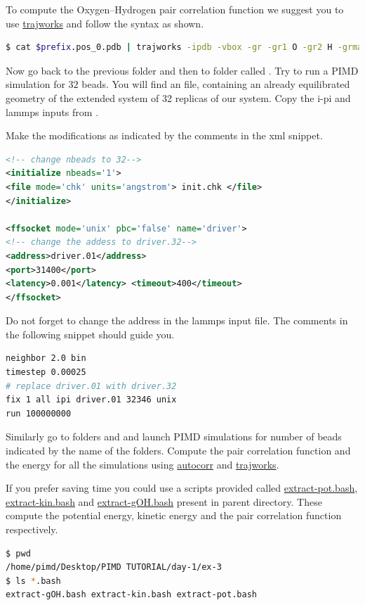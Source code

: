 \documentclass{article}
\begin{document}
\begin{Exercise}[label={basic},title={Benchmark of quantum effects in a water molecule}]
\Question
To compute the Oxygen--Hydrogen pair correlation function we suggest you to use \url{trajworks} and follow the syntax as shown. 
\begin{lstlisting}[language=bash]
$ cat $prefix.pos_0.pdb | trajworks -ipdb -vbox -gr -gr1 O -gr2 H -grmax 2 -hwin triangle -hwinfac 5  > gOO.data 
\end{lstlisting}

\Question
Now go back to the previous folder and then to folder called . Try to run a PIMD simulation for $32$ beads. You will find an  file, containing an already equilibrated geometry of the extended system of 32 replicas of our system. Copy the i-pi and lammps inputs from .

\Question
Make the modifications as indicated by the comments in the xml snippet.
\begin{lstlisting}[language=xml]
<!-- change nbeads to 32--> 
<initialize nbeads='1'>  
<file mode='chk' units='angstrom'> init.chk </file>
</initialize>

<ffsocket mode='unix' pbc='false' name='driver'>
<!-- change the addess to driver.32--> 
<address>driver.01</address>
<port>31400</port>
<latency>0.001</latency> <timeout>400</timeout>
</ffsocket>
\end{lstlisting}

\Question
Do not forget to change the address in the lammps input file. The comments in the following snippet should guide you.
\begin{lstlisting}[language=sh]
neighbor 2.0 bin
timestep 0.00025
# replace driver.01 with driver.32
fix 1 all ipi driver.01 32346 unix
run 100000000
\end{lstlisting}

\Question
Similarly go to folders  and  and launch PIMD simulations for number of beads indicated by the name of the folders.
Compute the pair correlation function and the energy for all the simulations using \url{autocorr} and \url{trajworks}.


\Question
If you prefer saving time you could use a scripts provided called \url{extract-pot.bash}, \url{extract-kin.bash} and \url{extract-gOH.bash} present in parent directory. These compute the potential energy, kinetic energy and the pair correlation function respectively. 
\begin{lstlisting}[language=bash]
$ pwd
/home/pimd/Desktop/PIMD TUTORIAL/day-1/ex-3
$ ls *.bash  
extract-gOH.bash extract-kin.bash extract-pot.bash
\end{lstlisting}



\end{Exercise}
\end{document}
